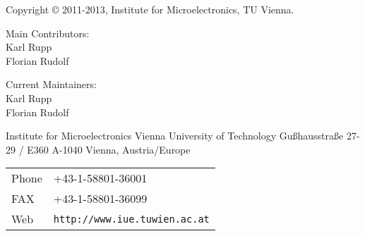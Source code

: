 
\clearpage

Copyright {\copyright} 2011-2013, Institute for Microelectronics, TU Vienna.

\vspace{3.5cm}

Main Contributors:\\

Karl Rupp\\
Florian Rudolf \\

\vspace{2.5cm}

Current Maintainers: \\

Karl Rupp\\
Florian Rudolf \\


\vspace{7.0cm}

Institute for Microelectronics\newline
Vienna University of Technology\newline
Gu\ss hausstra\ss e 27-29 / E360\newline
A-1040 Vienna, Austria/Europe\newline


\begin{tabular}{ll}
Phone  & +43-1-58801-36001\\
FAX    & +43-1-58801-36099\\
Web    & \texttt{http://www.iue.tuwien.ac.at}
\end{tabular}



